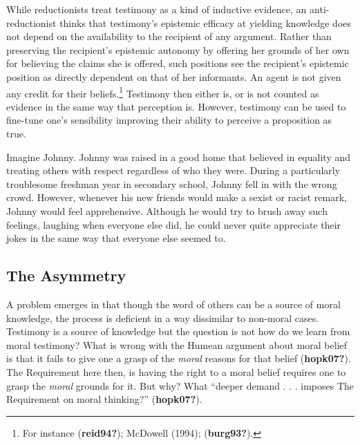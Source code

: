 \documentclass[12pt]{book}
\theoremstyle{definition}
\theoremstyle{remark}
\begin{document}
While reductionists treat testimony as a kind of inductive evidence, an anti-reductionist thinks that testimony's epistemic efficacy at yielding knowledge does not depend on the availability to the recipient of any argument. Rather than preserving the recipient's epistemic autonomy by offering her grounds of her own for believing the claims she is offered, such positions see the recipient's epistemic position as directly dependent on that of her informants. An agent is not given any credit for their beliefs.\footnote{For instance (\textbf{reid94?}); McDowell (1994); (\textbf{burg93?}).} Testimony then either is, or is not counted as evidence in the same way that perception is. However, testimony can be used to fine-tune one's sensibility improving their ability to perceive a proposition as true.

Imagine Johnny. Johnny was raised in a good home that believed in equality and treating others with respect regardless of who they were. During a particularly troublesome freshman year in secondary school, Johnny fell in with the wrong crowd. However, whenever his new friends would make a sexist or racist remark, Johnny would feel apprehensive. Although he would try to brush away such feelings, laughing when everyone else did, he could never quite appreciate their jokes in the same way that everyone else seemed to.

\subsection*{The Asymmetry}\label{the-asymmetry}

A problem emerges in that though the word of others can be a source of moral knowledge, the process is deficient in a way dissimilar to non-moral cases. Testimony is a source of knowledge but the question is not how do we learn from moral testimony? What is wrong with the Humean argument about moral belief is that it fails to give one a grasp of the \emph{moral} reasons for that belief (\textbf{hopk07?}). The Requirement here then, is having the right to a moral belief requires one to grasp the \emph{moral} grounds for it. But why? What ``deeper demand . . . imposes The Requirement on moral thinking?'' (\textbf{hopk07?}).
\end{document}
